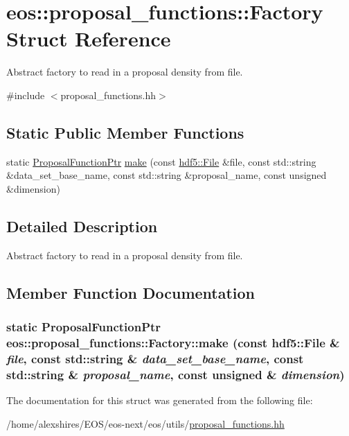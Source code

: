 \hypertarget{structeos_1_1proposal__functions_1_1Factory}{
\section{eos::proposal\_\-functions::Factory Struct Reference}
\label{structeos_1_1proposal__functions_1_1Factory}
}


Abstract factory to read in a proposal density from file.  


{\ttfamily \#include $<$proposal\_\-functions.hh$>$}\subsection*{Static Public Member Functions}
\begin{DoxyCompactItemize}
\item 
static \hyperlink{namespaceeos_ae97f9891c67c90959a03fc96efaa4dc9}{ProposalFunctionPtr} \hyperlink{structeos_1_1proposal__functions_1_1Factory_ada0a929817e75ed0ee50dcdbc496ca49}{make} (const \hyperlink{classeos_1_1hdf5_1_1File}{hdf5::File} \&file, const std::string \&data\_\-set\_\-base\_\-name, const std::string \&proposal\_\-name, const unsigned \&dimension)
\end{DoxyCompactItemize}


\subsection{Detailed Description}
Abstract factory to read in a proposal density from file. 

\subsection{Member Function Documentation}
\hypertarget{structeos_1_1proposal__functions_1_1Factory_ada0a929817e75ed0ee50dcdbc496ca49}{
\subsubsection[{make}]{\setlength{\rightskip}{0pt plus 5cm}static {\bf ProposalFunctionPtr} eos::proposal\_\-functions::Factory::make (const {\bf hdf5::File} \& {\em file}, \/  const std::string \& {\em data\_\-set\_\-base\_\-name}, \/  const std::string \& {\em proposal\_\-name}, \/  const unsigned \& {\em dimension})}}
\label{structeos_1_1proposal__functions_1_1Factory_ada0a929817e75ed0ee50dcdbc496ca49}


The documentation for this struct was generated from the following file:\begin{DoxyCompactItemize}
\item 
/home/alexshires/EOS/eos-\/next/eos/utils/\hyperlink{proposal__functions_8hh}{proposal\_\-functions.hh}\end{DoxyCompactItemize}

